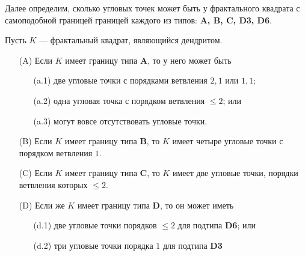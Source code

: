 Далее определим, сколько угловых точек может быть у фрактального квадрата с самоподобной границей границей каждого из типов: {\bf A, B, C, D3, D6}.

\begin{theorem}\label{thm:corner}
Пусть $K$ --- фрактальный квадрат, являющийся дендритом.
\begin{itemize}[nolistsep]
\item[(A)] Если $K$ имеет границу типа  {\bf A}, то у него может быть
	\begin{itemize}[nolistsep]
	\item[(a.1)] две угловые точки с порядками ветвления $2,1$ или $1,1$;
	\item[(a.2)] одна угловая точка с порядком ветвления $\le 2$; или 
	\item[(a.3)] могут вовсе отсутствовать угловые точки.
	\end{itemize}
\item[(B)] Если $K$ имеет границу типа  {\bf B}, то $K$ имеет четыре угловые точки с порядком ветвления $1$.
\item[(C)] Если $K$ имеет границу типа {\bf C}, то $K$ имеет две угловые точки, порядки ветвления которых $\le 2$.
\item[(D)] Если же $K$ имеет границу типа {\bf D}, то он может иметь 
	\begin{itemize}[nolistsep]
	\item[(d.1)] две угловые точки порядков $\le 2$ для подтипа {\bf D6}; или
	\item[(d.2)] три угловые точки порядка $1$ для подтипа {\bf D3}
	\end{itemize}
\end{itemize}
\end{theorem}

